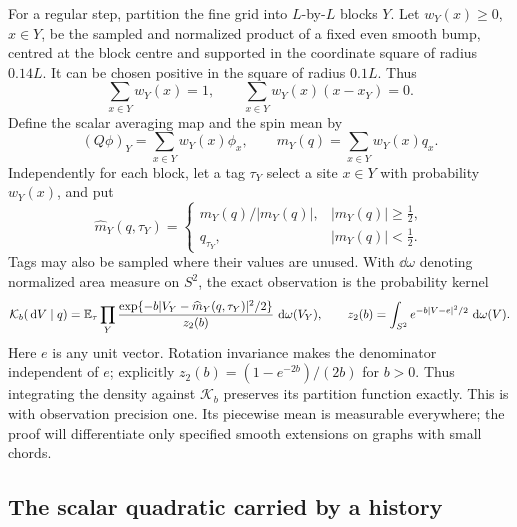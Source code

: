 For a regular step, partition the fine grid into \(L\)-by-\(L\) blocks
\(Y\).  Let \(w_Y(x)\ge0\), \(x\in Y\), be the sampled and normalized
product of a fixed even smooth bump, centred at the block centre and
supported in the coordinate square of radius \(0.14L\).  It can be
chosen positive in the square of radius \(0.1L\).  Thus
\[
 \sum_{x\in Y}w_Y(x)=1,\qquad
 \sum_{x\in Y}w_Y(x)(x-x_Y)=0.
\]
Define the scalar averaging map and the spin mean by
\[
 (Q\phi)_Y=\sum_{x\in Y}w_Y(x)\phi_x,
 \qquad m_Y(q)=\sum_{x\in Y}w_Y(x)q_x.
\]
Independently for each block, let a tag \(\tau_Y\) select a site
\(x\in Y\) with probability \(w_Y(x)\), and put
\begin{equation}
 \widehat m_Y(q,\tau_Y)=
 \begin{cases}
 m_Y(q)/|m_Y(q)|,& |m_Y(q)|\ge\tfrac12,\\
 q_{\tau_Y},& |m_Y(q)|<\tfrac12.
 \end{cases}
 \label{setup:unit-mean}
\end{equation}
Tags may also be sampled where their values are unused.  With
\(\dd\omega\) denoting normalized area measure on \(S^2\), the exact
observation is the probability kernel
\begin{equation}
 \mathcal K_b(\,\mathrm d V\mid q)
 =\mathbb E_{\tau}\prod_Y
 \frac{\exp\{-b|V_Y-\widehat m_Y(q,\tau_Y)|^2/2\}}
      {z_2(b)}\,\,\mathrm d\omega(V_Y),
 \qquad
 z_2(b)=\int_{S^2}e^{-b|V-e|^2/2}\,\,\mathrm d\omega(V).
 \label{setup:observation}
\end{equation}
Here \(e\) is any unit vector.  Rotation invariance makes the denominator
independent of \(e\); explicitly \(z_2(b)=(1-e^{-2b})/(2b)\) for
\(b>0\).  Thus integrating the density against
\(\mathcal K_b\) preserves its partition function exactly.  This is
 with observation precision one.  Its piecewise
mean is measurable everywhere; the proof will differentiate only
specified smooth extensions on graphs with small chords.

\subsection{The scalar quadratic carried by a history}
\label{setup:scalar-data}

